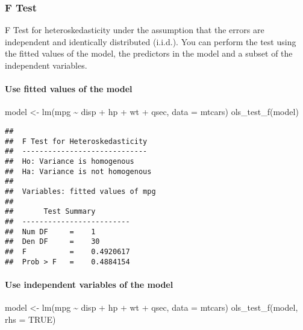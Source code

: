\documentclass[
]{article}
\newenvironment{Shaded}{\begin{snugshade}}{\end{snugshade}}
\newcommand{\AttributeTok}[1]{\textcolor[rgb]{0.77,0.63,0.00}{#1}}
\newcommand{\ConstantTok}[1]{\textcolor[rgb]{0.00,0.00,0.00}{#1}}
\newcommand{\FunctionTok}[1]{\textcolor[rgb]{0.00,0.00,0.00}{#1}}
\newcommand{\NormalTok}[1]{#1}
\newcommand{\OtherTok}[1]{\textcolor[rgb]{0.56,0.35,0.01}{#1}}
\newcommand{\SpecialCharTok}[1]{\textcolor[rgb]{0.00,0.00,0.00}{#1}}
\begin{document}
\hypertarget{f-test}{%
\subsubsection{F Test}\label{f-test}}

F Test for heteroskedasticity under the assumption that the errors are
independent and identically distributed (i.i.d.). You can perform the
test using the fitted values of the model, the predictors in the model
and a subset of the independent variables.

\hypertarget{use-fitted-values-of-the-model-2}{%
\paragraph{Use fitted values of the
model}\label{use-fitted-values-of-the-model-2}}

\begin{Shaded}
\begin{Highlighting}[]
\NormalTok{model }\OtherTok{\textless{}{-}} \FunctionTok{lm}\NormalTok{(mpg }\SpecialCharTok{\textasciitilde{}}\NormalTok{ disp }\SpecialCharTok{+}\NormalTok{ hp }\SpecialCharTok{+}\NormalTok{ wt }\SpecialCharTok{+}\NormalTok{ qsec, }\AttributeTok{data =}\NormalTok{ mtcars)}
\FunctionTok{ols\_test\_f}\NormalTok{(model)}
\end{Highlighting}
\end{Shaded}

\begin{verbatim}
## 
##  F Test for Heteroskedasticity
##  -----------------------------
##  Ho: Variance is homogenous
##  Ha: Variance is not homogenous
## 
##  Variables: fitted values of mpg 
## 
##       Test Summary        
##  -------------------------
##  Num DF     =    1 
##  Den DF     =    30 
##  F          =    0.4920617 
##  Prob > F   =    0.4884154
\end{verbatim}

\hypertarget{use-independent-variables-of-the-model-2}{%
\paragraph{Use independent variables of the
model}\label{use-independent-variables-of-the-model-2}}

\begin{Shaded}
\begin{Highlighting}[]
\NormalTok{model }\OtherTok{\textless{}{-}} \FunctionTok{lm}\NormalTok{(mpg }\SpecialCharTok{\textasciitilde{}}\NormalTok{ disp }\SpecialCharTok{+}\NormalTok{ hp }\SpecialCharTok{+}\NormalTok{ wt }\SpecialCharTok{+}\NormalTok{ qsec, }\AttributeTok{data =}\NormalTok{ mtcars)}
\FunctionTok{ols\_test\_f}\NormalTok{(model, }\AttributeTok{rhs =} \ConstantTok{TRUE}\NormalTok{)}
\end{Highlighting}
\end{Shaded}
\end{document}
